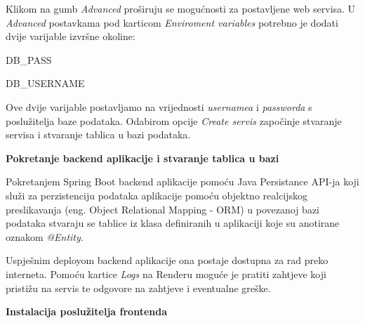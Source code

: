 			Klikom na gumb \textit{Advanced} proširuju se mogućnosti za postavljene web servisa. U \textit{Advanced} postavkama pod karticom \textit{Enviroment variables} potrebno je dodati dvije varijable izvršne okoline:
			\begin{packed_item}
				\item DB\_PASS
				\item DB\_USERNAME
			\end{packed_item}
			Ove dvije varijable postavljamo na vrijednosti \textit{usernamea} i \textit{passworda} s poslužitelja baze podataka. Odabirom opcije \textit{Create servis} započinje stvaranje servisa i stvaranje tablica u bazi podataka.
		
			
			\noindent \textbf{Pokretanje backend aplikacije i stvaranje tablica u bazi}
			
			Pokretanjem Spring Boot backend aplikacije pomoću Java Persistance API-ja koji služi za perzistenciju podataka aplikacije pomoću objektno realcijskog preslikavanja (eng. Object Relational Mapping - ORM) u povezanoj bazi podataka stvaraju se tablice iz klasa definiranih u aplikaciji koje su anotirane oznakom \textit{@Entity}. 
			
			Uspješnim deployom backend aplikacije ona postaje dostupna za rad preko interneta. Pomoću kartice \textit{Logs} na Renderu moguće je pratiti zahtjeve koji pristižu na servis te odgovore na zahtjeve i eventualne greške.
			
			
			\noindent \textbf{Instalacija poslužitelja frontenda}
			
